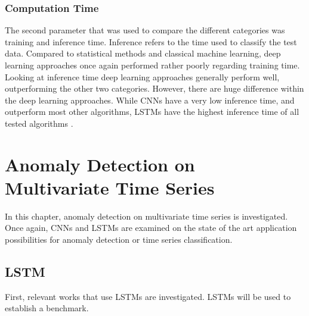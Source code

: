 \subsubsection{Computation Time}
The second parameter that was used to compare the different categories was training and inference time. Inference refers to the time used to classify the test data. Compared to statistical methods and classical machine learning, deep learning approaches once again performed rather poorly regarding training time. Looking at inference time deep learning approaches generally perform well, outperforming the other two categories. However, there are huge difference within the deep learning approaches. While CNNs have a very low inference time, and outperform most other algorithms, LSTMs have the highest inference time of all tested algorithms \parencite{Braei2020}.  


\section{Anomaly Detection on Multivariate Time Series}
In this chapter, anomaly detection on multivariate time series is investigated. Once again, CNNs and LSTMs are examined on the state of the art application possibilities for anomaly detection or time series classification.

\subsection{LSTM}
First, relevant works that use LSTMs are investigated. LSTMs will be used to establish a benchmark.

